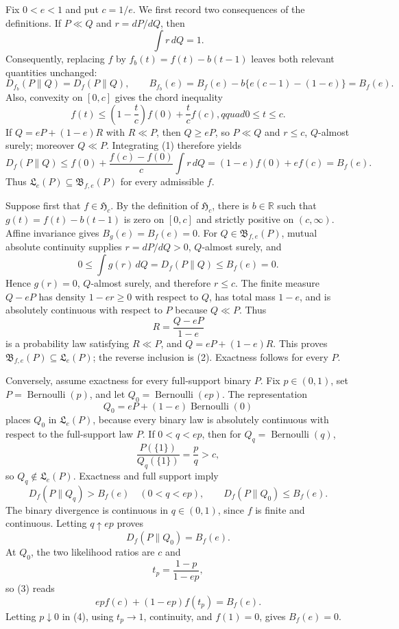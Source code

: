 Fix \(0<e<1\) and put \(c=1/e\).  We first record two consequences of the definitions.  If \(P\ll Q\) and \(r=dP/dQ\), then
\[
 \int r\,dQ=1.
\]
Consequently, replacing \(f\) by \(f_b(t)=f(t)-b(t-1)\) leaves both relevant quantities unchanged:
\[
 D_{f_b}(P\|Q)=D_f(P\|Q),\qquad
 B_{f_b}(e)=B_f(e)-b\{e(c-1)-(1-e)\}=B_f(e).
\]
Also, convexity on \([0,c]\) gives the chord inequality
\[
 f(t)\le \left(1-\frac{t}{c}\right)f(0)+\frac{t}{c}f(c),qquad 0\le t\le c. \tag{1}
\]
If \(Q=eP+(1-e)R\) with \(R\ll P\), then \(Q\ge eP\), so \(P\ll Q\) and \(r\le c\), \(Q\)-almost surely; moreover \(Q\ll P\).  Integrating (1) therefore yields
\[
 D_f(P\|Q)
 \le f(0)+\frac{f(c)-f(0)}{c}\int r\,dQ
 =(1-e)f(0)+ef(c)=B_f(e). \tag{2}
\]
Thus \(\mathfrak L_e(P)\subseteq\mathfrak B_{f,e}(P)\) for every admissible \(f\).

Suppose first that \(f\in\mathfrak H_c\).  By the definition of \(\mathfrak H_c\), there is \(b\in\mathbb R\) such that \(g(t)=f(t)-b(t-1)\) is zero on \([0,c]\) and strictly positive on \((c,\infty)\).  Affine invariance gives \(B_g(e)=B_f(e)=0\).  For \(Q\in\mathfrak B_{f,e}(P)\), mutual absolute continuity supplies \(r=dP/dQ>0\), \(Q\)-almost surely, and
\[
 0\le \int g(r)\,dQ=D_f(P\|Q)\le B_f(e)=0.
\]
Hence \(g(r)=0\), \(Q\)-almost surely, and therefore \(r\le c\).  The finite measure \(Q-eP\) has density \(1-er\ge0\) with respect to \(Q\), has total mass \(1-e\), and is absolutely continuous with respect to \(P\) because \(Q\ll P\).  Thus
\[
 R=\frac{Q-eP}{1-e}
\]
is a probability law satisfying \(R\ll P\), and \(Q=eP+(1-e)R\).  This proves \(\mathfrak B_{f,e}(P)\subseteq\mathfrak L_e(P)\); the reverse inclusion is (2).  Exactness follows for every \(P\).

Conversely, assume exactness for every full-support binary \(P\).  Fix \(p\in(0,1)\), set \(P=\operatorname{Bernoulli}(p)\), and let \(Q_0=\operatorname{Bernoulli}(ep)\).  The representation
\[
 Q_0=eP+(1-e)\operatorname{Bernoulli}(0)
\]
places \(Q_0\) in \(\mathfrak L_e(P)\), because every binary law is absolutely continuous with respect to the full-support law \(P\).  If \(0<q<ep\), then for \(Q_q=\operatorname{Bernoulli}(q)\),
\[
 \frac{P(\{1\})}{Q_q(\{1\})}=\frac pq>c,
\]
so \(Q_q\notin\mathfrak L_e(P)\).  Exactness and full support imply
\[
 D_f(P\|Q_q)>B_f(e)\quad(0<q<ep),
 \qquad D_f(P\|Q_0)\le B_f(e).
\]
The binary divergence is continuous in \(q\in(0,1)\), since \(f\) is finite and continuous.  Letting \(q\uparrow ep\) proves
\[
 D_f(P\|Q_0)=B_f(e). \tag{3}
\]
At \(Q_0\), the two likelihood ratios are \(c\) and
\[
 t_p=\frac{1-p}{1-ep},
\]
so (3) reads
\[
 ep f(c)+(1-ep)f(t_p)=B_f(e). \tag{4}
\]
Letting \(p\downarrow0\) in (4), using \(t_p\to1\), continuity, and \(f(1)=0\), gives \(B_f(e)=0\).

